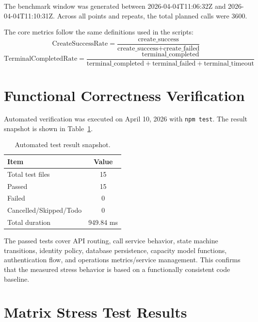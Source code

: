 \documentclass[12pt,a4paper]{report}
\begin{document}
The benchmark window was generated between 2026-04-04T11:06:32Z and 2026-04-04T11:10:31Z.
Across all points and repeats, the total planned calls were 3600.

The core metrics follow the same definitions used in the scripts:
\begin{equation}
\text{CreateSuccessRate}=\frac{\text{create\_success}}{\text{create\_success}+\text{create\_failed}}
\end{equation}
\begin{equation}
\text{TerminalCompletedRate}=\frac{\text{terminal\_completed}}{\text{terminal\_completed}+\text{terminal\_failed}+\text{terminal\_timeout}}
\end{equation}

\section{Functional Correctness Verification}
\label{sec:functional-correctness}
Automated verification was executed on April 10, 2026 with \texttt{npm test}. The result snapshot is shown in Table~\ref{tab:test-summary}.

\begin{table}[H]
\centering
\caption{Automated test result snapshot.}
\label{tab:test-summary}
\begin{tabular}{lc}
\toprule
Item & Value \\
\midrule
Total test files & 15 \\
Passed & 15 \\
Failed & 0 \\
Cancelled/Skipped/Todo & 0 \\
Total duration & 949.84 ms \\
\bottomrule
\end{tabular}
\end{table}

The passed tests cover API routing, call service behavior, state machine transitions, identity policy, database persistence, capacity model functions, authentication flow, and operations metrics/service management. This confirms that the measured stress behavior is based on a functionally consistent code baseline.

\section{Matrix Stress Test Results}
\label{sec:matrix-results}
\end{document}
